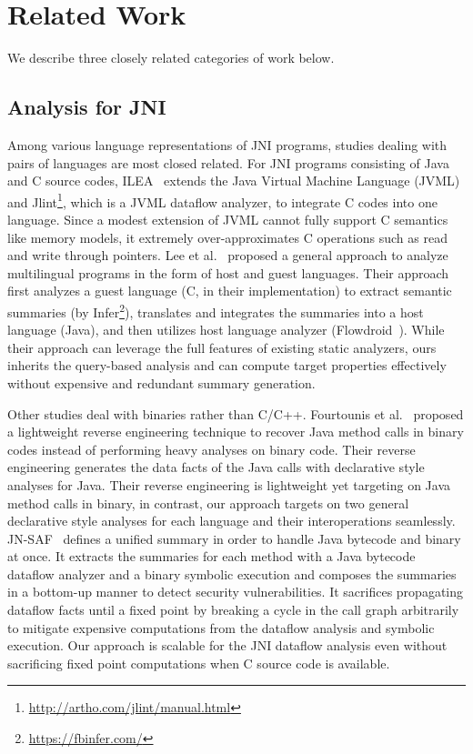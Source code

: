\section{Related Work}
We describe three closely related categories of work below.
\subsection{Analysis for JNI}
Among various language representations of JNI programs, studies dealing with
pairs of languages are most closed related.  For JNI programs consisting of
Java and C source codes, ILEA~\cite{ILEA} extends the Java Virtual Machine
Language (JVML) and Jlint\footnote{\url{http://artho.com/jlint/manual.html}},
which is a JVML dataflow analyzer, to integrate C codes into one language.
Since a modest extension of JVML cannot fully support C semantics like memory
models, it extremely over-approximates C operations such as read and write
through pointers.  Lee et al.~\cite{LeeASE20} proposed a general approach to
analyze multilingual programs in the form of host and guest languages.  Their
approach first analyzes a guest language (C, in their implementation) to extract
semantic summaries (by Infer\footnote{\url{https://fbinfer.com/}}), translates
and integrates the summaries into a host language (Java), and then utilizes host
language analyzer (Flowdroid~\cite{Flowdroid}).  While their approach can
leverage the full features of existing static analyzers, ours inherits the
query-based analysis and can compute target properties effectively without
expensive and redundant summary generation.

Other studies deal with binaries rather than C/C++.
Fourtounis et al.~\cite{scanning} proposed a lightweight reverse engineering
technique to recover Java method calls in binary codes instead of performing
heavy analyses on binary code.  Their reverse engineering generates the data
facts of the Java calls with declarative style analyses for Java.
Their reverse engineering is lightweight yet targeting on Java method calls in
binary, in contrast, our approach targets on two general declarative style
analyses for each language and their interoperations seamlessly.
JN-SAF~\cite{JN-SAF} defines a unified summary in order to handle Java bytecode
and binary at once.  It extracts the summaries for each method with a Java
bytecode dataflow analyzer and a binary symbolic execution and composes the
summaries in a bottom-up manner to detect security vulnerabilities.
It sacrifices propagating dataflow facts until a fixed point by breaking a cycle
in the call graph arbitrarily to mitigate expensive computations from the
dataflow analysis and symbolic execution.  Our approach is scalable for the JNI
dataflow analysis even without sacrificing fixed point computations when C
source code is available.

